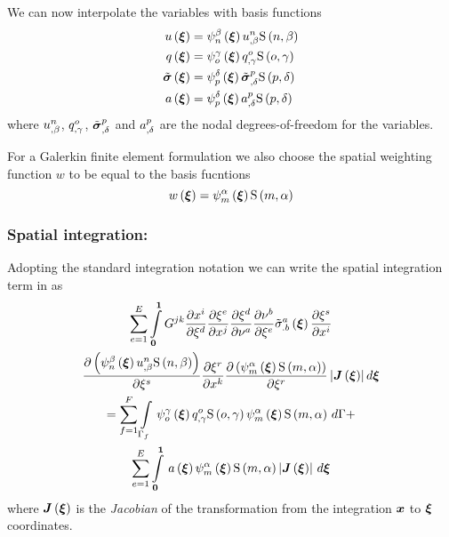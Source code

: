 We can now interpolate the variables with basis functions \ie
\begin{equation}
  \begin{split}
    \fnof{u}{\vect{\xi}} &=
    \gbfn{n}{\beta}{\vect{\xi}}\nodedof{u}{n}{\beta}\gsf{n}{\beta} \\
    \fnof{q}{\vect{\xi}} &= 
    \gbfn{o}{\gamma}{\vect{\xi}}\nodedof{q}{o}{\gamma}\gsf{o}{\gamma} \\
    \fnof{\tilde{\tensor{\sigma}}}{\vect{\xi}} &=
    \gbfn{p}{\delta}{\vect{\xi}}\nodedof{\tilde{\tensor{\sigma}}}{p}{\delta}\gsf{p}{\delta} \\
    \fnof{a}{\vect{\xi}} &=
    \gbfn{p}{\delta}{\vect{\xi}}\nodedof{a}{p}{\delta}\gsf{p}{\delta}
  \end{split}
\end{equation}
where $  {u}^{n} _{,\beta} $, $  {q}^{o} _{,\gamma} $, 
$  {\tilde{\boldsymbol{\sigma}}}^{p} _{,\delta} $ and $  {a}^{p} _{,\delta} $ are the
nodal degrees-of-freedom for the variables.

For a Galerkin finite element formulation we also choose the spatial weighting
function $w$ to be equal to the basis fucntions \ie
\begin{equation}
  \fnof{w}{\vect{\xi}}=\gbfn{m}{\alpha}{\vect{\xi}}\gsf{m}{\alpha}
\end{equation}

\subsubsection{Spatial integration:}

Adopting the standard integration notation we can write the spatial
integration term in  as
\begin{multline}
  \dsum_{e=1}^{E}\dintl{\vect{0}}{\vect{1}}G^{jk}\delby{x^{i}}{\xi^{d}}
    \delby{\xi^{e}}{x^{j}}\delby{\xi^{d}}{\nu^{a}}
    \delby{\nu^{b}}{\xi^{e}}\fnof{{\tilde{\sigma}}^{a}_{.b}}{\vect{\xi}}\delby{\xi^{s}}{x^{i}} \\
    \delby{\pbrac{\gbfn{n}{\beta}{\vect{\xi}}\nodedof{u}{n}{\beta}\gsf{n}{\beta}}}{\xi^{s}}
    \delby{\xi^{r}}{x^{k}}\delby{\pbrac{\gbfn{m}{\alpha}{\vect{\xi}}\gsf{m}{\alpha}}}{\xi^{r}}
    \abs{\fnof{\matr{J}}{\vect{\xi}}}d\vect{\xi} \\ 
  = \dsum_{f=1}^{F}\gint{\Gamma_{f}}{}{\gbfn{o}{\gamma}{\vect{\xi}}\nodedof{q}{o}{\gamma}
    \gsf{o}{\gamma}\gbfn{m}{\alpha}{\vect{\xi}}\gsf{m}{\alpha}}{\Gamma} + \\
  \dsum_{e=1}^{E}\gint{\vect{0}}{\vect{1}}{\fnof{a}{\vect{\xi}}\gbfn{m}{\alpha}{\vect{\xi}}
    \gsf{m}{\alpha}\abs{\fnof{\matr{J}}{\vect{\xi}}}}{\vect{\xi}}
\end{multline}
where $\fnof{\matr{J}}{\vect{\xi}}$ is the \emph{Jacobian} of the
transformation from the integration $\vect{x}$ to $\vect{\xi}$ coordinates.

